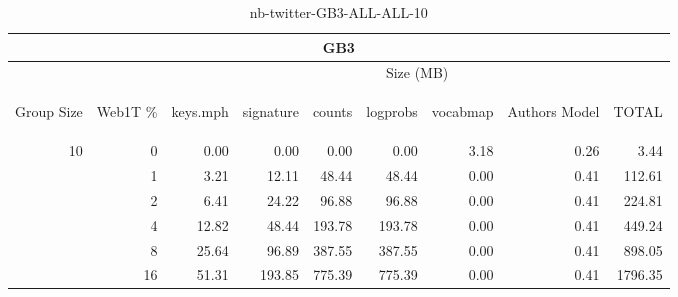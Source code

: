 \begin{center}
\begin{table}[htbp] 
 \begin{center}
\begin{tabular}{ | r | r | r | r | r | r | r | r | r |}
\hline
\multicolumn{9}{|c|}{GB3}\\
\hline
 & & \multicolumn{7}{|c|}{Size (MB)}\\ \cline{3-9}
\begin{sideways}Group Size\end{sideways} & \begin{sideways}Web1T \% \end{sideways} & \begin{sideways}keys.mph\end{sideways} & \begin{sideways}signature\end{sideways} & \begin{sideways}counts\end{sideways} & \begin{sideways}logprobs\end{sideways} & \begin{sideways}vocabmap\end{sideways} & \begin{sideways}Authors Model \end{sideways} & \begin{sideways}TOTAL\end{sideways}\\
\hline
\multirow{5}{*}{10}
 & 0 & 0.00 & 0.00 & 0.00 & 0.00 & 3.18 & 0.26 & 3.44\\ \cline{2-9}
 & 1 & 3.21 & 12.11 & 48.44 & 48.44 & 0.00 & 0.41 & 112.61\\ \cline{2-9}
 & 2 & 6.41 & 24.22 & 96.88 & 96.88 & 0.00 & 0.41 & 224.81\\ \cline{2-9}
 & 4 & 12.82 & 48.44 & 193.78 & 193.78 & 0.00 & 0.41 & 449.24\\ \cline{2-9}
 & 8 & 25.64 & 96.89 & 387.55 & 387.55 & 0.00 & 0.41 & 898.05\\ \cline{2-9}
 & 16 & 51.31 & 193.85 & 775.39 & 775.39 & 0.00 & 0.41 & 1796.35\\ \cline{2-9}
\hline
\end{tabular}
\caption{nb-twitter-GB3-ALL-ALL-10}
\label{table:nb-twitter-GB3-ALL-ALL-10}
\end{center}
 \end{table}
\end{center}

